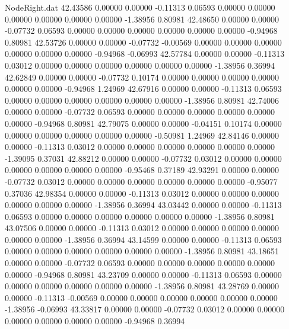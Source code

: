 \begin{filecontents}{NodeRight.dat}
  42.43586    0.00000    0.00000    -0.11313    0.06593    0.00000    0.00000    0.00000    0.00000    0.00000    0.00000   -1.38956    0.80981
  42.48650    0.00000    0.00000    -0.07732    0.06593    0.00000    0.00000    0.00000    0.00000    0.00000    0.00000   -0.94968    0.80981
  42.53726    0.00000    0.00000    -0.07732   -0.00569    0.00000    0.00000    0.00000    0.00000    0.00000    0.00000   -0.94968   -0.06993
  42.57784    0.00000    0.00000    -0.11313    0.03012    0.00000    0.00000    0.00000    0.00000    0.00000    0.00000   -1.38956    0.36994
  42.62849    0.00000    0.00000    -0.07732    0.10174    0.00000    0.00000    0.00000    0.00000    0.00000    0.00000   -0.94968    1.24969
  42.67916    0.00000    0.00000    -0.11313    0.06593    0.00000    0.00000    0.00000    0.00000    0.00000    0.00000   -1.38956    0.80981
  42.74006    0.00000    0.00000    -0.07732    0.06593    0.00000    0.00000    0.00000    0.00000    0.00000    0.00000   -0.94968    0.80981
  42.79075    0.00000    0.00000    -0.04151    0.10174    0.00000    0.00000    0.00000    0.00000    0.00000    0.00000   -0.50981    1.24969
  42.84146    0.00000    0.00000    -0.11313    0.03012    0.00000    0.00000    0.00000    0.00000    0.00000    0.00000   -1.39095    0.37031
  42.88212    0.00000    0.00000    -0.07732    0.03012    0.00000    0.00000    0.00000    0.00000    0.00000    0.00000   -0.95468    0.37189
  42.93291    0.00000    0.00000    -0.07732    0.03012    0.00000    0.00000    0.00000    0.00000    0.00000    0.00000   -0.95077    0.37036
  42.98354    0.00000    0.00000    -0.11313    0.03012    0.00000    0.00000    0.00000    0.00000    0.00000    0.00000   -1.38956    0.36994
  43.03442    0.00000    0.00000    -0.11313    0.06593    0.00000    0.00000    0.00000    0.00000    0.00000    0.00000   -1.38956    0.80981
  43.07506    0.00000    0.00000    -0.11313    0.03012    0.00000    0.00000    0.00000    0.00000    0.00000    0.00000   -1.38956    0.36994
  43.14599    0.00000    0.00000    -0.11313    0.06593    0.00000    0.00000    0.00000    0.00000    0.00000    0.00000   -1.38956    0.80981
  43.18651    0.00000    0.00000    -0.07732    0.06593    0.00000    0.00000    0.00000    0.00000    0.00000    0.00000   -0.94968    0.80981
  43.23709    0.00000    0.00000    -0.11313    0.06593    0.00000    0.00000    0.00000    0.00000    0.00000    0.00000   -1.38956    0.80981
  43.28769    0.00000    0.00000    -0.11313   -0.00569    0.00000    0.00000    0.00000    0.00000    0.00000    0.00000   -1.38956   -0.06993
  43.33817    0.00000    0.00000    -0.07732    0.03012    0.00000    0.00000    0.00000    0.00000    0.00000    0.00000   -0.94968    0.36994

\end{filecontents}

